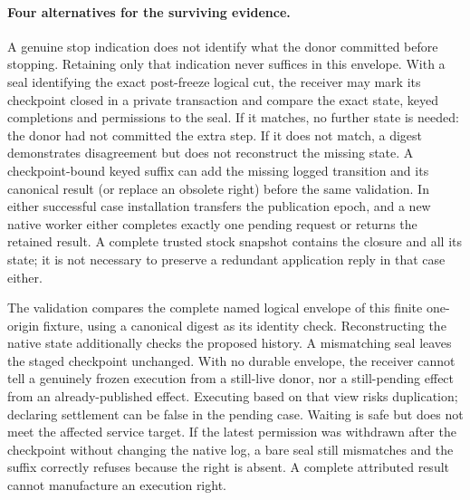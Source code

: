 \documentclass{article}
\begin{document}
\paragraph{Four alternatives for the surviving evidence.}
A genuine stop indication does not identify what the donor committed
before stopping. Retaining only that indication never suffices in
this envelope. With a seal identifying the exact post-freeze logical
cut, the receiver may mark its checkpoint closed in a private
transaction and compare the exact state, keyed completions and
permissions to the seal. If it matches, no further state is needed:
the donor had not committed the extra step. If it does not match,
a digest demonstrates disagreement but does not reconstruct the
missing state. A checkpoint-bound keyed suffix can add the missing
logged transition and its canonical result (or replace an obsolete
right) before the same validation. In either successful case
installation transfers the publication epoch, and a new native
worker either completes exactly one pending request or returns the
retained result. A complete trusted stock snapshot contains the
closure and all its state; it is not necessary to preserve a
redundant application reply in that case either.

The validation compares the complete named logical envelope of
this finite one-origin fixture, using a canonical digest as its
identity check. Reconstructing the native state additionally
checks the proposed history. A mismatching seal leaves the staged
checkpoint unchanged. With no durable envelope, the receiver
cannot tell a genuinely frozen execution from a still-live donor,
nor a still-pending effect from an already-published effect.
Executing based on that view risks duplication; declaring
settlement can be false in the pending case. Waiting is safe but
does not meet the affected service target. If the latest permission
was withdrawn after the checkpoint without changing the native
log, a bare seal still mismatches and the suffix correctly refuses
because the right is absent. A complete attributed result cannot
manufacture an execution right.
\end{document}
